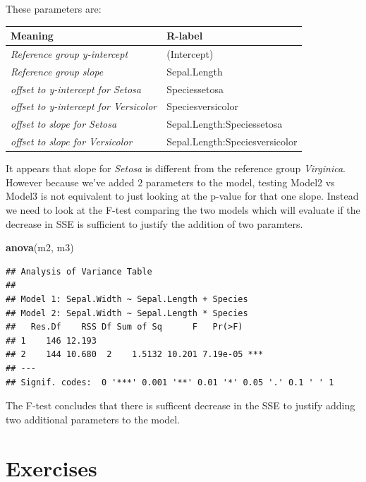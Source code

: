 \documentclass[]{book}
\newenvironment{Shaded}{\begin{snugshade}}{\end{snugshade}}
\newcommand{\KeywordTok}[1]{\textcolor[rgb]{0.13,0.29,0.53}{\textbf{{#1}}}}
\newcommand{\NormalTok}[1]{{#1}}
\theoremstyle{definition}
\theoremstyle{definition}
\theoremstyle{remark}
\begin{document}
These parameters are:

\begin{longtable}[]{@{}ll@{}}
\toprule
Meaning & R-label\tabularnewline
\midrule
\endhead
\emph{Reference group y-intercept } & (Intercept)\tabularnewline
\emph{Reference group slope } & Sepal.Length\tabularnewline
\emph{offset to y-intercept for Setosa} & Speciessetosa\tabularnewline
\emph{offset to y-intercept for Versicolor} &
Speciesversicolor\tabularnewline
\emph{offset to slope for Setosa} &
Sepal.Length:Speciessetosa\tabularnewline
\emph{offset to slope for Versicolor} &
Sepal.Length:Speciesversicolor\tabularnewline
\bottomrule
\end{longtable}

It appears that slope for \emph{Setosa} is different from the reference
group \emph{Virginica}. However because we've added \(2\) parameters to
the model, testing Model2 vs Model3 is not equivalent to just looking at
the p-value for that one slope. Instead we need to look at the F-test
comparing the two models which will evaluate if the decrease in SSE is
sufficient to justify the addition of two paramters.

\begin{Shaded}
\begin{Highlighting}[]
\KeywordTok{anova}\NormalTok{(m2, m3)}
\end{Highlighting}
\end{Shaded}

\begin{verbatim}
## Analysis of Variance Table
## 
## Model 1: Sepal.Width ~ Sepal.Length + Species
## Model 2: Sepal.Width ~ Sepal.Length * Species
##   Res.Df    RSS Df Sum of Sq      F   Pr(>F)    
## 1    146 12.193                                 
## 2    144 10.680  2    1.5132 10.201 7.19e-05 ***
## ---
## Signif. codes:  0 '***' 0.001 '**' 0.01 '*' 0.05 '.' 0.1 ' ' 1
\end{verbatim}

The F-test concludes that there is sufficent decrease in the SSE to
justify adding two additional parameters to the model.

\section{Exercises}\label{exercises-3}
\end{document}
